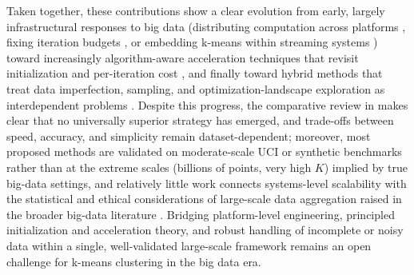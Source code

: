 Taken together, these contributions show a clear evolution from early, largely infrastructural responses to big data (distributing computation across platforms \cite{singh2014survey}, fixing iteration budgets \cite{jain2014adapting}, or embedding k-means within streaming systems \cite{laskar2021extending}) toward increasingly algorithm-aware acceleration techniques that revisit initialization \cite{celebi2012comparative,ekta2018improved,chen2019big} and per-iteration cost \cite{xie2020improvement}, and finally toward hybrid methods that treat data imperfection, sampling, and optimization-landscape exploration as interdependent problems \cite{wang2019means,mussabayev2023comparative,mussabayev2025bimodalclust}. Despite this progress, the comparative review in \cite{mussabayev2023comparative} makes clear that no universally superior strategy has emerged, and trade-offs between speed, accuracy, and simplicity remain dataset-dependent; moreover, most proposed methods are validated on moderate-scale UCI or synthetic benchmarks rather than at the extreme scales (billions of points, very high $K$) implied by true big-data settings, and relatively little work connects systems-level scalability with the statistical and ethical considerations of large-scale data aggregation raised in the broader big-data literature \cite{varian2014big,carbonell2016ethics}. Bridging platform-level engineering, principled initialization and acceleration theory, and robust handling of incomplete or noisy data within a single, well-validated large-scale framework remains an open challenge for k-means clustering in the big data era.

